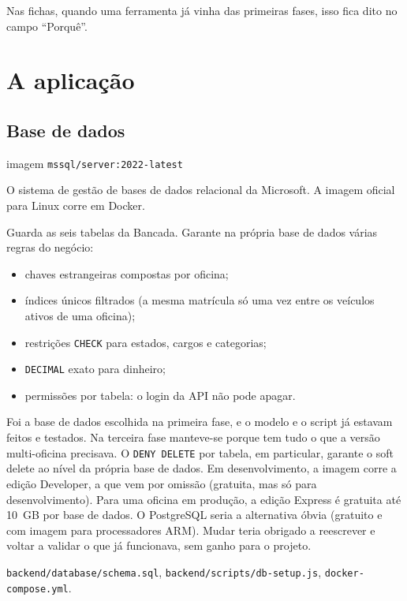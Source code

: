 \documentclass[a4paper,12pt]{article}
\newenvironment{ficha}[2]{%
  \par\needspace{7\baselineskip}\medskip\noindent{\large\bfseries #1}\hfill{\small\color{gray!70!black}#2}\par\nopagebreak\smallskip
  \begin{description}[leftmargin=3.1cm,labelwidth=2.8cm,labelsep=0.3cm,font=\normalfont\bfseries\small,itemsep=2pt,topsep=2pt,before=\raggedright]
}{\end{description}\medskip}
\begin{document}
Nas fichas, quando uma ferramenta já vinha das primeiras fases, isso fica dito no campo ``Porquê''.

\section{A aplicação}

\subsection{Base de dados}

\begin{ficha}{SQL Server 2022}{imagem \texttt{mssql/server:2022-latest}}
  \item[O que é] O sistema de gestão de bases de dados relacional da Microsoft. A imagem oficial para Linux corre em Docker.
  \item[Para que serviu] Guarda as seis tabelas da Bancada. Garante na própria base de dados várias regras do negócio:
  \begin{itemize}
    \item chaves estrangeiras compostas por oficina;
    \item índices únicos filtrados (a mesma matrícula só uma vez entre os veículos ativos de uma oficina);
    \item restrições \texttt{CHECK} para estados, cargos e categorias;
    \item \texttt{DECIMAL} exato para dinheiro;
    \item permissões por tabela: o login da API não pode apagar.
  \end{itemize}
  \item[Porquê] Foi a base de dados escolhida na primeira fase, e o modelo e o script já estavam feitos e testados. Na terceira fase manteve-se porque tem tudo o que a versão multi-oficina precisava. O \texttt{DENY DELETE} por tabela, em particular, garante o soft delete ao nível da própria base de dados. Em desenvolvimento, a imagem corre a edição Developer, a que vem por omissão (gratuita, mas só para desenvolvimento). Para uma oficina em produção, a edição Express é gratuita até 10~GB por base de dados. O PostgreSQL seria a alternativa óbvia (gratuito e com imagem para processadores ARM). Mudar teria obrigado a reescrever e voltar a validar o que já funcionava, sem ganho para o projeto.
  \item[Onde está] \texttt{backend/database/schema.sql}, \texttt{backend/scripts/db-setup.js}, \texttt{docker-compose.yml}.
\end{ficha}
\end{document}
